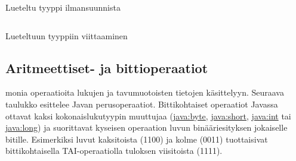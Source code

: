 \documentclass{tufte-book}
\newcommand{\java}[1]{\underline{\gls{java:#1}}}
\newcommand{\code}[3]{
\begin{listing}
    \inputminted{java}{OhjelmointiopasEsimerkit/src/#1/#2.java}
    \caption{#3}
    \label{Java-#1-#2}
\end{listing}
}
\begin{document}
\code{week3/enumexample}{CompassPoint}{Lueteltu tyyppi ilmansuunnista}
\code{week3/enumexample}{Main}{Lueteltuun tyyppiin viittaaminen}

\subsection{Aritmeettiset- ja bittioperaatiot}
\label{operaatiot}

 monia operaatioita lukujen ja tavumuotoisten tietojen käsittelyyn.
Seuraava taulukko esittelee Javan perusoperaatiot. Bittikohtaiset operaatiot Javassa ottavat
kaksi kokonaislukutyypin muuttujaa (\java{byte}, \java{short}, \java{int} tai \java{long}) ja
suorittavat kyseisen operaation luvun binääriesityksen jokaiselle bitille. Esimerkiksi luvut
kaksitoista (1100) ja kolme (0011) tuottaisivat bittikohtaisella TAI-operaatiolla tuloksen
viisitoista (1111).
\end{document}
